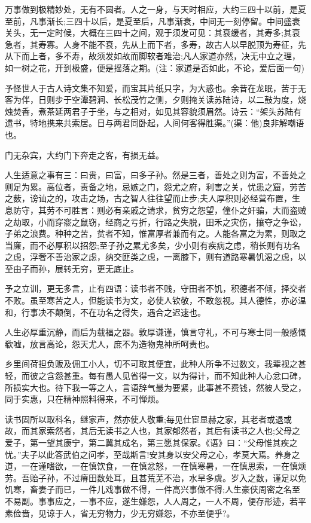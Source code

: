 \documentclass[letterpaper,12pt,english]{sphinxmanual}
\begin{document}
万事做到极精妙处，无有不圆者。人之一身，与天时相应，大约三四十以前，是夏至前，凡事渐长;三四十以后，是夏至后，凡事渐衰，中间无一刻停留。中间盛衰关头，无一定时候，大概在三四十之间，观于须发可见：其衰缓者，其寿多;其衰急者，其寿寡。人身不能不衰，先从上而下者，多寿，故古人以早脱顶为寿征，先从下而上者，多不寿，故须发如故而脚软者难治;凡人家道亦然，决无中立之理，如一树之花，开到极盛，便是摇落之期。(注：家道是否如此，不论，爱后面一句)

予怪世人于古人诗文集不知爱，而宝其片纸只字，为大惑也。余昔在龙眠，苦于无客为伴，日则步于空潭碧涧、长松茂竹之侧，夕则掩关读苏陆诗，以二鼓为度，烧烛焚香，煮茶延两君子于坐，与之相对，如见其容貌须眉然。诗云：“架头苏陆有遗书，特地携来共索居。日与两君同卧起，人间何客得胜渠。”(渠：他)良非解嘲语也。

门无杂宾，大约门下奔走之客，有损无益。

人生适意之事有三：曰贵，曰富，曰多子孙。然是三者，善处之则为富，不善处之则足为累。高位者，责备之地，忌嫉之门，怨尤之府，利害之关，忧患之窟，劳苦之薮，谤讪之的，攻击之场，古之智人往往望而止步;夫人厚积则必经营布置，生息防守，其劳不可胜言：则必有亲戚之请求，贫穷之怨望，僮仆之奸骗，大而盗贼之劫取，小而穿窬之鼠窃，经商之亏折，行路之失脱，田禾之灾伤，攘夺之争讼，子弟之浪费。种种之苦，贫者不知，惟富厚者兼而有之。人能各富之为累，则取之当廉，而不必厚积以招怨;至子孙之累尤多矣，少小则有疾病之虑，稍长则有功名之虑，浮奢不善治家之虑，纳交匪类之虑，一离膝下，则有道路寒暑饥渴之虑，以至由子而孙，展转无穷，更无底止。

予之立训，更无多言，止有四语：读书者不贱，守田者不饥，积德者不倾，择交者不败。虽至寒苦之人，但能读书为文，必使人钦敬，不敢忽视。其人德性，亦必温和，行事决不颠倒，不在功名之得失，遇合之迟速也。

人生必厚重沉静，而后为载福之器。敦厚谦谨，慎言守礼，不可与寒士同一般感慨欷嘘，放言高论，怨天尤人，庶不为造物鬼神所呵责也。

乡里间荷担负贩及佣工小人，切不可取其便宜，此种人所争不过数文，我辈视之甚轻，而彼之含怨甚重。每有愚人见省得一文，以为得计，而不知此种人心忿口碑，所损实大也。待下我一等之人，言语辞气最为要紧，此事甚不费钱，然彼人受之，同于实惠，只在精神照料得来，不可惮烦。

读书固所以取科名，继家声，然亦使人敬重;每见仕宦显赫之家，其老者或退或故，而其家索然者，其后无读书之人也，其家郁然者，其后有读书之人也;父母之爱子，第一望其康宁，第二冀其成名，第三愿其保家。《语》曰：“父母惟其疾之忧。”夫子以此答武伯之问孝，至哉斯言!安其身以安父母之心，孝莫大焉。养身之道，一在谨嗜欲，一在慎饮食，一在慎忿怒，一在慎寒暑，一在慎思索，一在慎烦劳。吾贻子孙，不过瘠田数处耳，且甚荒芜不治，水旱多虞。岁入之数，谨足以免饥寒，畜妻子而已，一件儿戏事做不得，一件高兴事做不得;人生豪侠周密之名至不易副。事事应之，一事不应，遂生嫌怨，人人周之，一人不周，便存形迹，若平素俭啬，见谅于人，省无穷物力，少无穷嫌怨，不亦至便乎?。
\end{document}
